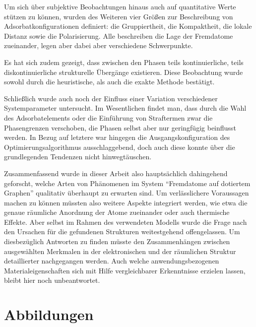 \documentclass[a4paper, 10pt, twoside, openany]{book} %
\begin{document}
Um sich über subjektive Beobachtungen hinaus auch auf quantitative Werte stützen zu können, wurden des Weiteren vier Größen zur Beschreibung von Adsorbatkonfigurationen definiert: die Gruppiertheit, die Kompaktheit, die lokale Distanz sowie die Polarisierung. Alle beschreiben die Lage der Fremdatome zueinander, legen aber dabei aber verschiedene Schwerpunkte.

Es hat sich zudem gezeigt, dass zwischen den Phasen teils kontinuierliche, teils diskontinuierliche strukturelle Übergänge existieren. Diese Beobachtung wurde sowohl durch die heuristische, als auch die exakte Methode bestätigt.

Schließlich wurde auch noch der Einfluss einer Variation verschiedener Systemparameter untersucht. Im Wesentlichen findet man, dass durch die Wahl des Adsorbatelements oder die Einführung von Straftermen zwar die Phasengrenzen verschoben, die Phasen selbst aber nur geringfügig beinflusst werden. In Bezug auf letztere war hingegen die Ausgangskonfiguration des Optimierungsalgorithmus ausschlaggebend, doch auch diese konnte über die grundlegenden Tendenzen nicht hinwegtäuschen.

Zusammenfassend wurde in dieser Arbeit also hauptsächlich dahingehend geforscht, welche Arten von Phänomenen im System "`Fremdatome auf dotiertem Graphen"' qualitativ überhaupt zu erwarten sind. Um verlässlichere Voraussagen machen zu können müssten also weitere Aspekte integriert werden, wie etwa die genaue räumliche Anordnung der Atome zueinander oder auch thermische Effekte. Aber selbst im Rahmen des verwendeten Modells wurde die Frage nach den Ursachen für die gefundenen Strukturen weitestgehend offengelassen. Um diesbezüglich Antworten zu finden müsste den Zusammenhängen zwischen ausgewählten Merkmalen in der elektronischen und der räumlichen Struktur detaillierter nachgegangen werden. Auch welche anwendungsbezogenen Materialeigenschaften sich mit Hilfe vergleichbarer Erkenntnisse erzielen lassen, bleibt hier noch unbeantwortet.

\appendix

\chapter{Abbildungen}
\end{document}
